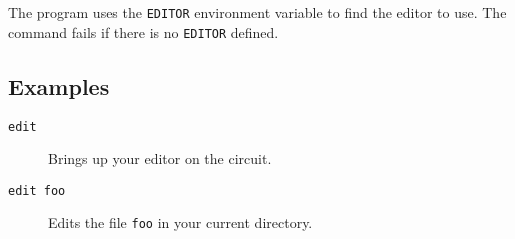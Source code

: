 The program uses the {\tt EDITOR} environment variable to find the editor
to use.  The command fails if there is no {\tt EDITOR} defined.
\subsection{Examples}

\begin{description}

\item[{\tt edit}] Brings up your editor on the circuit.

\item[{\tt edit foo}] Edits the file {\tt foo} in your current directory.

\end{description}
